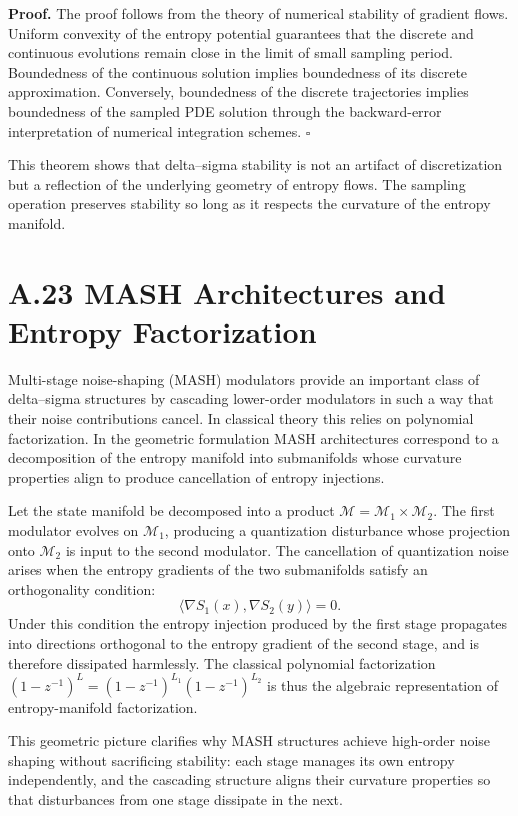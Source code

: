 \medskip

\textbf{Proof.}
The proof follows from the theory of numerical stability of gradient flows. Uniform convexity of the entropy potential guarantees that the discrete and continuous evolutions remain close in the limit of small sampling period. Boundedness of the continuous solution implies boundedness of its discrete approximation. Conversely, boundedness of the discrete trajectories implies boundedness of the sampled PDE solution through the backward-error interpretation of numerical integration schemes. \(\square\)

\medskip

This theorem shows that delta–sigma stability is not an artifact of discretization but a reflection of the underlying geometry of entropy flows. The sampling operation preserves stability so long as it respects the curvature of the entropy manifold.

\section{A.23 MASH Architectures and Entropy Factorization}

Multi-stage noise-shaping (MASH) modulators provide an important class of delta–sigma structures by cascading lower-order modulators in such a way that their noise contributions cancel. In classical theory this relies on polynomial factorization. In the geometric formulation MASH architectures correspond to a decomposition of the entropy manifold into submanifolds whose curvature properties align to produce cancellation of entropy injections.

Let the state manifold be decomposed into a product \(\mathcal{M} = \mathcal{M}_1 \times \mathcal{M}_2\). The first modulator evolves on \(\mathcal{M}_1\), producing a quantization disturbance whose projection onto \(\mathcal{M}_2\) is input to the second modulator. The cancellation of quantization noise arises when the entropy gradients of the two submanifolds satisfy an orthogonality condition:
\[
\langle \nabla S_1(x), \nabla S_2(y) \rangle = 0.
\]
Under this condition the entropy injection produced by the first stage propagates into directions orthogonal to the entropy gradient of the second stage, and is therefore dissipated harmlessly. The classical polynomial factorization \( (1 - z^{-1})^L = (1 - z^{-1})^{L_1} (1 - z^{-1})^{L_2} \) is thus the algebraic representation of entropy-manifold factorization.

This geometric picture clarifies why MASH structures achieve high-order noise shaping without sacrificing stability: each stage manages its own entropy independently, and the cascading structure aligns their curvature properties so that disturbances from one stage dissipate in the next.

